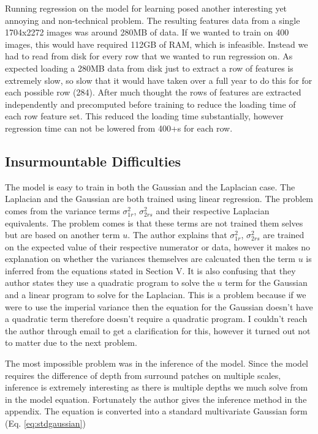 \documentclass[journal]{IEEEtran}
\begin{document}
Running regression on the model for learning posed another interesting yet annoying and non-technical problem. The resulting features data from a single 1704x2272 images was around 280MB of data. If we wanted to train on 400 images, this would have required 112GB of RAM, which is infeasible. Instead we had to read from disk for every row that we wanted to run regression on. As expected loading a 280MB data from disk just to extract a row of features is extremely slow, so slow that it would have taken over a full year to do this for for each possible row (284). After much thought the rows of features are extracted independently and precomputed before training to reduce the loading time of each row feature set. This reduced the loading time substantially, however regression time can not be lowered from 400+s for each row.

\subsection{Insurmountable Difficulties}
The model is easy to train in both the Gaussian and the Laplacian case. The Laplacian and the Gaussian are both trained using linear regression. The problem comes from the variance terms $\sigma^2_{1r}$, $\sigma^2_{2rs}$ and their respective Laplacian equivalents. The problem comes is that these terms are not trained them selves but are based on another term $u$. The author explains that $\sigma^2_{1r}$, $\sigma^2_{2rs}$ are trained on the expected value of their respective numerator or data, however it makes no explanation on whether the variances themselves are calcuated then the term $u$ is inferred from the equations stated in Section V. It is also confusing that they author states they use a quadratic program to solve the $u$ term for the Gaussian and a linear program to solve for the Laplacian. This is a problem because if we were to use the imperial variance then the equation for the Gaussian doesn't have a quadratic term therefore doesn't require a quadratic program. I couldn't reach the author through email to get a clarification for this, however it turned out not to matter due to the next problem.

The most impossible problem was in the inference of the model. Since the model requires the difference of depth from surround patches on multiple scales, inference is extremely interesting as there is multiple depths we much solve from in the model equation. Fortunately the author gives the inference method in the appendix. The equation is converted into a standard multivariate Gaussian form (Eq. \ref{eq:stdgaussian})
\end{document}
